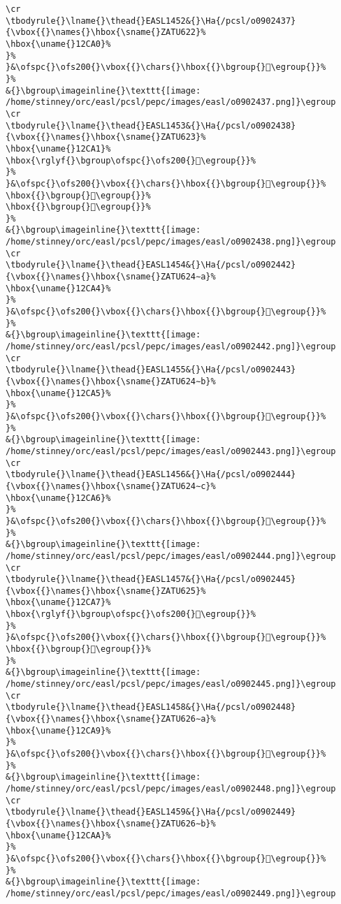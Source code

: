 \begin{verbatim}
\cr
\tbodyrule{}\lname{}\thead{}EASL1452&{}\Ha{/pcsl/o0902437}{\vbox{{}\names{}\hbox{\sname{}ZATU622}%
\hbox{\uname{}12CA0}%
}%
}&\ofspc{}\ofs200{}\vbox{{}\chars{}\hbox{{}\bgroup{}𒲠\egroup{}}%
}%
&{}\bgroup\imageinline{}\texttt{[image: /home/stinney/orc/easl/pcsl/pepc/images/easl/o0902437.png]}\egroup
\cr
\tbodyrule{}\lname{}\thead{}EASL1453&{}\Ha{/pcsl/o0902438}{\vbox{{}\names{}\hbox{\sname{}ZATU623}%
\hbox{\uname{}12CA1}%
\hbox{\rglyf{}\bgroup\ofspc{}\ofs200{}𒲡\egroup{}}%
}%
}&\ofspc{}\ofs200{}\vbox{{}\chars{}\hbox{{}\bgroup{}𒲣\egroup{}}%
\hbox{{}\bgroup{}𒲢\egroup{}}%
\hbox{{}\bgroup{}𒲡\egroup{}}%
}%
&{}\bgroup\imageinline{}\texttt{[image: /home/stinney/orc/easl/pcsl/pepc/images/easl/o0902438.png]}\egroup
\cr
\tbodyrule{}\lname{}\thead{}EASL1454&{}\Ha{/pcsl/o0902442}{\vbox{{}\names{}\hbox{\sname{}ZATU624∼a}%
\hbox{\uname{}12CA4}%
}%
}&\ofspc{}\ofs200{}\vbox{{}\chars{}\hbox{{}\bgroup{}𒲤\egroup{}}%
}%
&{}\bgroup\imageinline{}\texttt{[image: /home/stinney/orc/easl/pcsl/pepc/images/easl/o0902442.png]}\egroup
\cr
\tbodyrule{}\lname{}\thead{}EASL1455&{}\Ha{/pcsl/o0902443}{\vbox{{}\names{}\hbox{\sname{}ZATU624∼b}%
\hbox{\uname{}12CA5}%
}%
}&\ofspc{}\ofs200{}\vbox{{}\chars{}\hbox{{}\bgroup{}𒲥\egroup{}}%
}%
&{}\bgroup\imageinline{}\texttt{[image: /home/stinney/orc/easl/pcsl/pepc/images/easl/o0902443.png]}\egroup
\cr
\tbodyrule{}\lname{}\thead{}EASL1456&{}\Ha{/pcsl/o0902444}{\vbox{{}\names{}\hbox{\sname{}ZATU624∼c}%
\hbox{\uname{}12CA6}%
}%
}&\ofspc{}\ofs200{}\vbox{{}\chars{}\hbox{{}\bgroup{}𒲦\egroup{}}%
}%
&{}\bgroup\imageinline{}\texttt{[image: /home/stinney/orc/easl/pcsl/pepc/images/easl/o0902444.png]}\egroup
\cr
\tbodyrule{}\lname{}\thead{}EASL1457&{}\Ha{/pcsl/o0902445}{\vbox{{}\names{}\hbox{\sname{}ZATU625}%
\hbox{\uname{}12CA7}%
\hbox{\rglyf{}\bgroup\ofspc{}\ofs200{}𒲧\egroup{}}%
}%
}&\ofspc{}\ofs200{}\vbox{{}\chars{}\hbox{{}\bgroup{}𒲧\egroup{}}%
\hbox{{}\bgroup{}𒲨\egroup{}}%
}%
&{}\bgroup\imageinline{}\texttt{[image: /home/stinney/orc/easl/pcsl/pepc/images/easl/o0902445.png]}\egroup
\cr
\tbodyrule{}\lname{}\thead{}EASL1458&{}\Ha{/pcsl/o0902448}{\vbox{{}\names{}\hbox{\sname{}ZATU626∼a}%
\hbox{\uname{}12CA9}%
}%
}&\ofspc{}\ofs200{}\vbox{{}\chars{}\hbox{{}\bgroup{}𒲩\egroup{}}%
}%
&{}\bgroup\imageinline{}\texttt{[image: /home/stinney/orc/easl/pcsl/pepc/images/easl/o0902448.png]}\egroup
\cr
\tbodyrule{}\lname{}\thead{}EASL1459&{}\Ha{/pcsl/o0902449}{\vbox{{}\names{}\hbox{\sname{}ZATU626∼b}%
\hbox{\uname{}12CAA}%
}%
}&\ofspc{}\ofs200{}\vbox{{}\chars{}\hbox{{}\bgroup{}𒲪\egroup{}}%
}%
&{}\bgroup\imageinline{}\texttt{[image: /home/stinney/orc/easl/pcsl/pepc/images/easl/o0902449.png]}\egroup

\end{verbatim}
